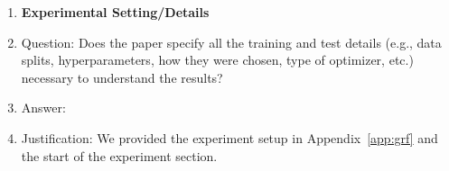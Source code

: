 \begin{enumerate}
\item {\bf Experimental Setting/Details}
    \item[] Question: Does the paper specify all the training and test details (e.g., data splits, hyperparameters, how they were chosen, type of optimizer, etc.) necessary to understand the results?
    \item[] Answer: \answerYes{} %
    \item[] Justification: We provided the experiment setup in Appendix~\ref{app:grf} and the start of the experiment section.


\end{enumerate}
